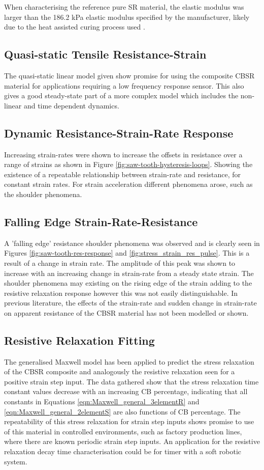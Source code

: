 When characterising the reference pure SR material, the elastic modulus was larger than the 186.2 kPa elastic modulus specified by the manufacturer, likely due to the heat assisted curing process used \cite{Johnston2014}.


\subsection{Quasi-static Tensile Resistance-Strain}
The quasi-static linear model given show promise for using the composite CBSR material for applications requiring a low frequency response sensor. This also gives a good steady-state part of a more complex model which includes the non-linear and time dependent dynamics.


\subsection{Dynamic Resistance-Strain-Rate Response}
Increasing strain-rates were shown to increase the offsets in resistance over a range of strains as shown in Figure \ref{fig:saw-tooth-hysteresis-loops}. Showing the existence of a repeatable relationship between strain-rate and resistance, for constant strain rates. For strain acceleration different phenomena arose, such as the shoulder phenomena.


\subsection{Falling Edge Strain-Rate-Resistance}
A 'falling edge' resistance shoulder phenomena was observed and is clearly seen in Figures \ref{fig:saw-tooth-res-response} and \ref{fig:stress_strain_res_pulse}. This is a result of a change in strain rate. The amplitude of this peak was shown to increase with an increasing change in strain-rate from a steady state strain. The shoulder phenomena may existing on the rising edge of the strain adding to the resistive relaxation response however this was not easily distinguishable. In previous literature, the effects of the strain-rate and sudden change in strain-rate on apparent resistance of the CBSR material has not been modelled or shown.

\subsection{Resistive Relaxation Fitting}
The generalised Maxwell model has been applied to predict the stress relaxation of the CBSR composite and analogously the resistive relaxation seen for a positive strain step input. The data gathered show that the stress relaxation time constant values decrease with an increasing CB percentage, indicating that all constants in Equations \ref{eqn:Maxwell_general_3elementR} and \ref{eqn:Maxwell_general_2elementS} are also functions of CB percentage. The repeatability of this stress relaxation for strain step inputs shows promise to use of this material in controlled environments, such as factory production lines, where there are known periodic strain step inputs. An application for the resistive relaxation decay time characterisation could be for timer with a soft robotic system.


